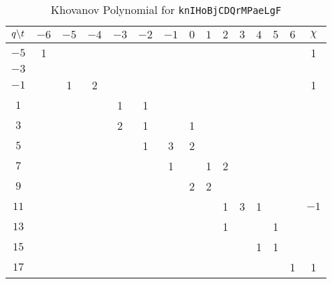 \documentclass{article}
\theoremstyle{plain}
\begin{document}
        \begin{table}[H]
            \centering
            \begin{tabular}{| c | c | c | c | c | c | c | c | c | c | c | c | c | c | c |}
                \hline
                $q\symbol{92}t$&$-6$&$-5$&$-4$&$-3$&$-2$&$-1$&$0$&$1$&$2$&$3$&$4$&$5$&$6$&$\chi$\\
                \hline
                $-5$&1&&&&&&&&&&&&&1\\
                \hline
                $-3$&&&&&&&&&&&&&&\\
                \hline
                $-1$&&1&2&&&&&&&&&&&1\\
                \hline
                $1$&&&&1&1&&&&&&&&&\\
                \hline
                $3$&&&&2&1&&1&&&&&&&\\
                \hline
                $5$&&&&&1&3&2&&&&&&&\\
                \hline
                $7$&&&&&&1&&1&2&&&&&\\
                \hline
                $9$&&&&&&&2&2&&&&&&\\
                \hline
                $11$&&&&&&&&&1&3&1&&&$-1$\\
                \hline
                $13$&&&&&&&&&1&&&1&&\\
                \hline
                $15$&&&&&&&&&&&1&1&&\\
                \hline
                $17$&&&&&&&&&&&&&1&1\\
                \hline
            \end{tabular}
            \caption{Khovanov Polynomial for \texttt{knIHoBjCDQrMPaeLgF}}
            \label{table:knIHoBjCDQrMPaeLgF_kho}
        \end{table}
\end{document}
